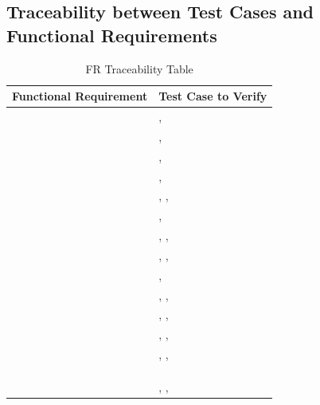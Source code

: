 \documentclass[12pt, titlepage]{article}
\begin{document}
\subsection{Traceability between Test Cases and Functional Requirements}
\begin{table}[!h]
\begin{center}
\caption {FR Traceability Table}
\label{tab:FR_Trace}
\begin{tabular}{ | m{8cm} | m{8cm} | } 
\hline
Functional Requirement & Test Case to Verify \\
\hline
\nameref{GEN_001} & \nameref{tab:STC_014}, \nameref{tab:STC_016} \\ \hline
\nameref{GEN_002} & \nameref{tab:STC_013}, \nameref{tab:STC_016} \\ \hline
\nameref{GEN_003} & \nameref{tab:STC_001}, \nameref{tab:STC_003} \\ \hline
\nameref{GEN_004} & \nameref{tab:STC_001}, \nameref{tab:STC_002} \\ \hline
\nameref{GEN_005} & \nameref{tab:STC_013}, \nameref{tab:STC_016}, \nameref{tab:STC_015} \\ \hline
\nameref{GEN_006} & \nameref{tab:STC_013}, \nameref{tab:STC_016}\\ \hline
\nameref{STA_000} & \nameref{tab:STC_001}, \nameref{tab:STC_002}, \nameref{tab:STC_003} \\ \hline
\nameref{STA_001} & \nameref{tab:STC_001}, \nameref{tab:STC_002}, \nameref{tab:STC_003} \\ \hline
\nameref{STA_002} & \nameref{tab:STC_005}, \nameref{tab:STC_011} \\ \hline
\nameref{STA_003} & \nameref{tab:STC_016}, \nameref{tab:STC_012}, \nameref{tab:STC_013} \\ \hline
\nameref{STA_004} & \nameref{tab:STC_001}, \nameref{tab:STC_002}, \nameref{tab:STC_003} \\ \hline
\nameref{STA_005} & \nameref{tab:STC_001}, \nameref{tab:STC_002}, \nameref{tab:STC_003} \\ \hline
\nameref{STA_006} & \nameref{tab:STC_001}, \nameref{tab:STC_002}, \nameref{tab:STC_003} \\ \hline
\nameref{STA_007} & \nameref{tab:STC_011} \\ \hline
\nameref{STA_008} & \nameref{tab:STC_012} \\ \hline
\nameref{STA_009} & \nameref{tab:STC_006} \\ \hline
\nameref{STA_010} & \nameref{tab:STC_008}, \nameref{tab:STC_009}, \nameref{tab:STC_010} \\ \hline

\end{tabular}
\end{center}
\end{table}
\end{document}
